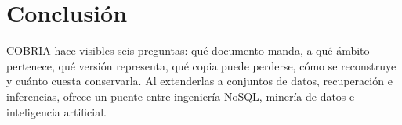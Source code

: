 \chapter{Conclusión}

COBRIA hace visibles seis preguntas: qué documento manda, a qué ámbito pertenece, qué
versión representa, qué copia puede perderse, cómo se reconstruye y cuánto cuesta
conservarla. Al extenderlas a conjuntos de datos, recuperación e inferencias, ofrece un
puente entre ingeniería NoSQL, minería de datos e inteligencia artificial.

\COBRIAConclusionCientifica
